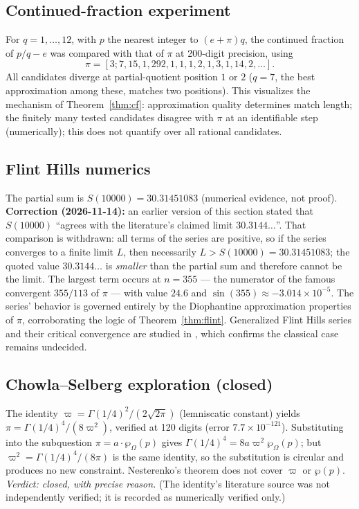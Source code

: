 \documentclass[11pt]{amsart}
\theoremstyle{definition}
\theoremstyle{remark}
\numberwithin{equation}{section}
\begin{document}
\subsection{Continued-fraction experiment}

For $q=1,\dots,12$, with $p$ the nearest integer to $(e+\pi)q$, the continued fraction of $p/q-e$ was compared with that of $\pi$ at 200-digit precision, using
\[
\pi=[3;7,15,1,292,1,1,1,2,1,3,1,14,2,\dots].
\] All candidates diverge at partial-quotient position $1$ or $2$ ($q=7$, the best approximation among these, matches two positions). This visualizes the mechanism of Theorem~\ref{thm:cf}: approximation quality determines match length; the finitely many tested candidates disagree with $\pi$ at an identifiable step (numerically); this does not quantify over all rational candidates.

\subsection{Flint Hills numerics}

The partial sum is $S(10000)=30.31451083$ (numerical evidence, not proof). \textbf{Correction (2026-11-14):} an earlier version of this section stated that $S(10000)$ ``agrees with the literature's claimed limit $30.3144\dots$''. That comparison is withdrawn: all terms of the series are positive, so if the series converges to a finite limit $L$, then necessarily $L>S(10000)=30.31451083$; the quoted value $30.3144\dots$ is \emph{smaller} than the partial sum and therefore cannot be the limit. The largest term occurs at $n=355$ --- the numerator of the famous convergent $355/113$ of $\pi$ --- with value $24.6$ and $\sin(355)\approx-3.014\times10^{-5}$. The series' behavior is governed entirely by the Diophantine approximation properties of $\pi$, corroborating the logic of Theorem~\ref{thm:flint}. Generalized Flint Hills series and their critical convergence are studied in \cite{Dan2026}, which confirms the classical case remains undecided.

\subsection{Chowla--Selberg exploration (closed)}

The identity $\varpi=\Gamma(1/4)^2/(2\sqrt{2\pi})$ (lemniscatic constant) yields $\pi=\Gamma(1/4)^4/(8\varpi^2)$, verified at 120 digits (error $7.7\times10^{-121}$). Substituting into the subquestion $\pi=a\cdot\wp_\Omega(p)$ gives $\Gamma(1/4)^4=8a\varpi^2\wp_\Omega(p)$; but $\varpi^2=\Gamma(1/4)^4/(8\pi)$ is the same identity, so the substitution is circular and produces no new constraint. Nesterenko's theorem does not cover $\varpi$ or $\wp(p)$. \emph{Verdict: closed, with precise reason.} (The identity's literature source was not independently verified; it is recorded as numerically verified only.)
\end{document}

